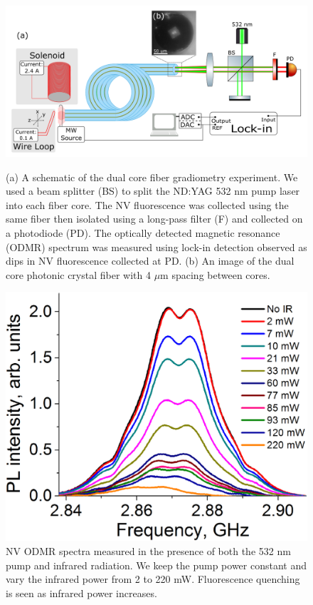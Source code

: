 \documentclass[12 pt]{article}
\begin{document}
\begin{figure}
    \centering
    \begin{minipage}{0.6\textwidth}
    \includegraphics[width = 1.0\textwidth]{Images/DualCore.png}
    \caption{(a) A schematic of the dual core fiber gradiometry experiment. We used a beam splitter (BS) to split 
    the ND:YAG 532 nm pump laser into each fiber core. The NV fluorescence was collected using the same fiber then isolated using a long-pass filter (F) 
    and collected on a photodiode (PD). The optically detected magnetic resonance (ODMR) spectrum was measured using
lock-in detection observed as dips in NV fluorescence collected at PD. (b) An image of the dual core photonic crystal fiber with 4 $\mu$m spacing between cores.}
    \label{fig:DualCore}
    \end{minipage}
    \qquad
    \begin{minipage}{0.3\textwidth}
    \includegraphics[width = 1.0\textwidth]{Images/FluorQuen.jpg}
    \caption{NV ODMR spectra measured in the presence of both the 532 nm pump and infrared radiation. We keep the 
    pump power constant and vary the infrared power from 2 to 220 mW. Fluorescence quenching is seen as infrared
    power increases.}
    \label{fig:FluorQuen}
    \end{minipage}
\end{figure}
\end{document}
